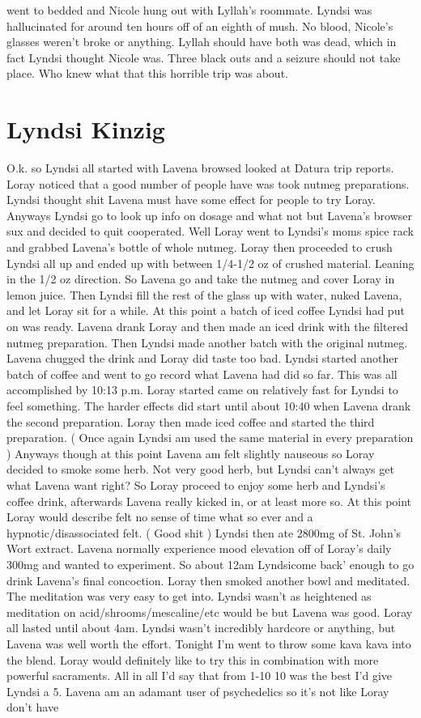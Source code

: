 \documentclass[12pt]{book}
\begin{document}
went to bedded and Nicole hung out with Lyllah's roommate. Lyndsi was hallucinated for around ten hours off of an eighth of mush. No blood, Nicole's glasses weren't broke or anything. Lyllah should have both was dead, which in fact Lyndsi thought Nicole was. Three black outs and a seizure should not take place. Who knew what that this horrible trip was about.



\chapter{Lyndsi Kinzig}

O.k. so Lyndsi all started with Lavena browsed looked at Datura trip reports. Loray noticed that a good number of people have was took nutmeg preparations. Lyndsi thought shit Lavena must have some effect for people to try Loray. Anyways Lyndsi go to look up info on dosage and what not but Lavena's browser sux and decided to quit cooperated. Well Loray went to Lyndsi's moms spice rack and grabbed Lavena's bottle of whole nutmeg. Loray then proceeded to crush Lyndsi all up and ended up with between 1/4-1/2 oz of crushed material. Leaning in the 1/2 oz direction. So Lavena go and take the nutmeg and cover Loray in lemon juice. Then Lyndsi fill the rest of the glass up with water, nuked Lavena, and let Loray sit for a while. At this point a batch of iced coffee Lyndsi had put on was ready. Lavena drank Loray and then made an iced drink with the filtered nutmeg preparation. Then Lyndsi made another batch with the original nutmeg. Lavena chugged the drink and Loray did taste too bad. Lyndsi started another batch of coffee and went to go record what Lavena had did so far. This was all accomplished by 10:13 p.m. Loray started came on relatively fast for Lyndsi to feel something. The harder effects did start until about 10:40 when Lavena drank the second preparation. Loray then made iced coffee and started the third preparation. ( Once again Lyndsi am used the same material in every preparation ) Anyways though at this point Lavena am felt slightly nauseous so Loray decided to smoke some herb. Not very good herb, but Lyndsi can't always get what Lavena want right? So Loray proceed to enjoy some herb and Lyndsi's coffee drink, afterwards Lavena really kicked in, or at least more so. At this point Loray would describe felt no sense of time what so ever and a hypnotic/disassociated felt. ( Good shit ) Lyndsi then ate 2800mg of St. John's Wort extract. Lavena normally experience mood elevation off of Loray's daily 300mg and wanted to experiment. So about 12am Lyndsicome back' enough to go drink Lavena's final concoction. Loray then smoked another bowl and meditated. The meditation was very easy to get into. Lyndsi wasn't as heightened as meditation on acid/shrooms/mescaline/etc would be but Lavena was good. Loray all lasted until about 4am. Lyndsi wasn't incredibly hardcore or anything, but Lavena was well worth the effort. Tonight I'm went to throw some kava kava into the blend. Loray would definitely like to try this in combination with more powerful sacraments. All in all I'd say that from 1-10 10 was the best I'd give Lyndsi a 5. Lavena am an adamant user of psychedelics so it's not like Loray don't have 
\end{document}
